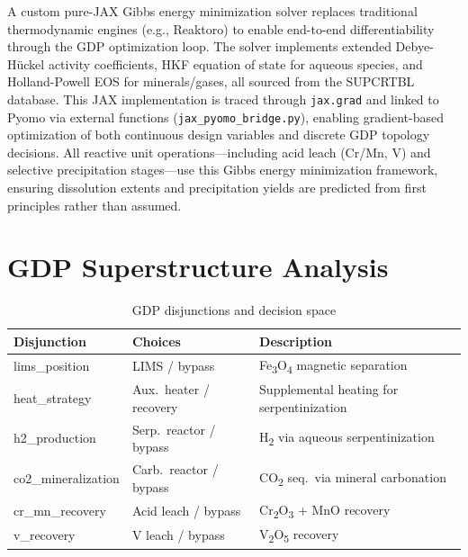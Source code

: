 \documentclass[11pt,a4paper]{article}
\begin{document}
\noindent A custom pure-JAX Gibbs energy minimization solver replaces
traditional thermodynamic engines (e.g., Reaktoro) to enable end-to-end
differentiability through the GDP optimization loop. The solver implements
extended Debye-H\"uckel activity coefficients, HKF equation of state for
aqueous species, and Holland-Powell EOS for minerals/gases, all sourced from
the SUPCRTBL database. This JAX implementation is traced through
\texttt{jax.grad} and linked to Pyomo via external functions
(\texttt{jax\_pyomo\_bridge.py}), enabling gradient-based optimization
of both continuous design variables and discrete GDP topology decisions.
All reactive unit operations---including acid leach (Cr/Mn, V) and
selective precipitation stages---use this Gibbs energy minimization
framework, ensuring dissolution extents and precipitation yields are
predicted from first principles rather than assumed.

\section{GDP Superstructure Analysis}

\begin{table}[H]
\centering
\caption{GDP disjunctions and decision space}
\label{tab:disj}
\begin{tabular}{@{}llp{7cm}@{}}
\toprule
\textbf{Disjunction} & \textbf{Choices} & \textbf{Description} \\
\midrule
lims\_position       & LIMS / bypass          & Fe\textsubscript{3}O\textsubscript{4} magnetic separation \\
heat\_strategy       & Aux.\ heater / recovery & Supplemental heating for serpentinization \\
h2\_production       & Serp.\ reactor / bypass & H\textsubscript{2} via aqueous serpentinization \\
co2\_mineralization & Carb.\ reactor / bypass  & CO\textsubscript{2} seq.\ via mineral carbonation \\
cr\_mn\_recovery     & Acid leach / bypass     & Cr\textsubscript{2}O\textsubscript{3} + MnO recovery \\
v\_recovery          & V leach / bypass        & V\textsubscript{2}O\textsubscript{5} recovery \\
\bottomrule
\end{tabular}
\end{table}
\end{document}
